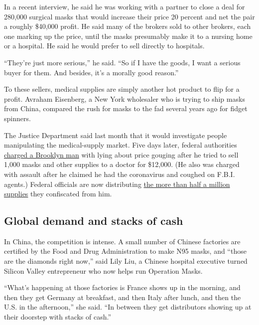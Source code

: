 In a recent interview, he said he was working with a partner to close a
deal for 280,000 surgical masks that would increase their price 20
percent and net the pair a roughly \$40,000 profit. He said many of the
brokers sold to other brokers, each one marking up the price, until the
masks presumably make it to a nursing home or a hospital. He said he
would prefer to sell directly to hospitals.

``They're just more serious,'' he said. ``So if I have the goods, I want
a serious buyer for them. And besides, it's a morally good reason.''

To these sellers, medical supplies are simply another hot product to
flip for a profit. Avraham Eisenberg, a New York wholesaler who is
trying to ship masks from China, compared the rush for masks to the fad
several years ago for fidget spinners.

The Justice Department said last month that it would investigate people
manipulating the medical-supply market. Five days later, federal
authorities
\href{https://www.bloomberg.com/news/articles/2020-03-30/suspected-mask-profiteer-arrested-for-coughing-on-fbi-agents}{charged
a Brooklyn man} with lying about price gouging after he tried to sell
1,000 masks and other supplies to a doctor for \$12,000. (He also was
charged with assault after he claimed he had the coronavirus and coughed
on F.B.I. agents.) Federal officials are now distributing
\href{https://www.hhs.gov/about/news/2020/04/02/doj-and-hhs-partner-to-distribute-more-than-half-a-million-medical-supplies-confiscated-from-price-gougers.html}{the
more than half a million supplies} they confiscated from him.

\hypertarget{global-demand-and-stacks-of-cash}{%
\subsection{Global demand and stacks of
cash}\label{global-demand-and-stacks-of-cash}}

In China, the competition is intense. A small number of Chinese
factories are certified by the Food and Drug Administration to make N95
masks, and ``those are the diamonds right now,'' said Lily Liu, a
Chinese hospital executive turned Silicon Valley entrepreneur who now
helps run Operation Masks.

``What's happening at those factories is France shows up in the morning,
and then they get Germany at breakfast, and then Italy after lunch, and
then the U.S. in the afternoon,'' she said. ``In between they get
distributors showing up at their doorstep with stacks of cash.''

